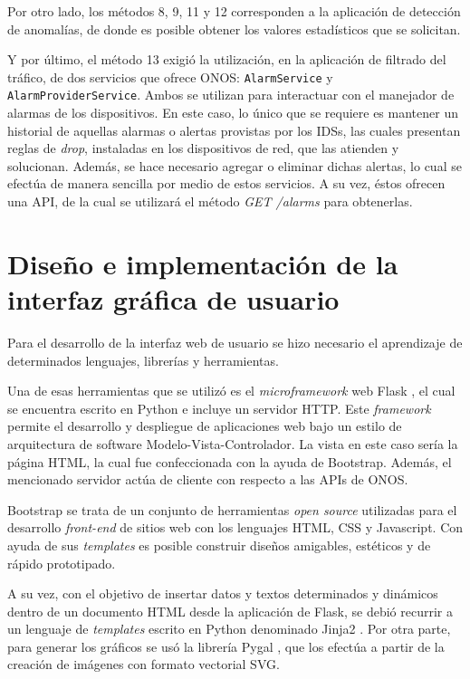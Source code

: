 	Por otro lado, los métodos 8, 9, 11 y 12 corresponden a la aplicación de detección de anomalías, de donde es posible obtener los valores estadísticos que se solicitan.

	Y por último, el método 13 exigió la utilización, en la aplicación de filtrado del tráfico, de dos servicios que ofrece ONOS: \texttt{AlarmService} y \texttt{AlarmProviderService}. Ambos se utilizan para interactuar con el manejador de alarmas de los dispositivos. En este caso, lo único que se requiere es mantener un historial de aquellas alarmas o alertas provistas por los IDSs, las cuales presentan reglas de \textit{drop}, instaladas en los dispositivos de red, que las atienden y solucionan. Además, se hace necesario agregar o eliminar dichas alertas, lo cual se efectúa de manera sencilla por medio de estos servicios. A su vez, éstos ofrecen una API, de la cual se utilizará el método \textit{GET /alarms} para obtenerlas.



\section {Diseño e implementación de la interfaz gráfica de usuario}

Para el desarrollo de la interfaz web de usuario se hizo necesario el
aprendizaje de determinados lenguajes, librerías y herramientas.

Una de esas herramientas que se utilizó es el \textit{microframework} web Flask \parencite{flask}, el cual se encuentra escrito en Python e incluye un servidor HTTP. Este \textit{framework} permite el desarrollo y despliegue de aplicaciones web bajo un estilo de arquitectura de software Modelo-Vista-Controlador. La vista en este caso sería la página HTML, la cual fue confeccionada con la ayuda de Bootstrap.
Además, el mencionado servidor actúa de cliente con respecto a las APIs de ONOS.

Bootstrap \parencite{bootstrap} se trata de un conjunto de herramientas \textit{open source} utilizadas para el desarrollo \textit{front-end} de sitios web con los lenguajes HTML, CSS y Javascript. Con ayuda de sus \textit{templates} es posible construir diseños amigables, estéticos y de rápido prototipado.

A su vez, con el objetivo de insertar datos y textos determinados y dinámicos dentro de un documento HTML desde la aplicación de Flask, se debió recurrir a un lenguaje de \textit{templates} escrito en Python denominado Jinja2 \parencite{jinja}. Por otra parte, para generar los gráficos se usó la librería Pygal \parencite{pygal}, que los efectúa a partir de la creación de imágenes con formato vectorial SVG.


